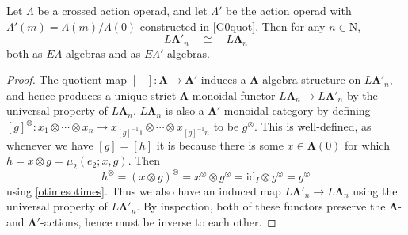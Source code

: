 \documentclass{amsbook} %
\newcommand{\id}{\textrm{id}}
\newcommand{\ML}{\mathbf{\Lambda}}
\numberwithin{section}{chapter}
\begin{document}
\begin{prop} \label{noscalarcross} Let $\Lambda$ be a crossed action operad, and let $\Lambda'$ be the action operad with $\Lambda'(m) = \Lambda(m)/\Lambda(0)$ constructed in \cref{G0quot}. Then for any $n \in \mathrm{N}$,
\[ L\ML'_n \quad \cong \quad L\ML_n \]
both as $E\Lambda$-algebras and as $E\Lambda'$-algebras. %
\end{prop}
\begin{proof}

The quotient map $[-]:\ML \to \ML'$ induces a $\ML$-algebra structure on $L\ML'_n$, and hence produces a unique strict $\ML$-monoidal functor $L\ML_n \to L\ML'_n$ by the universal property of $L\ML_n$. $L\ML_n$ is also a $\ML'$-monoidal category by defining $[g]^{\otimes} : x_1 \otimes \cdots \otimes x_n \to x_{[g]^{-1}1} \otimes \cdots \otimes x_{[g]^{-1}n}$ to be $g^{\otimes}$. This is well-defined, as whenever we have $[g] = [h]$ it is because there is some $x \in \ML(0)$ for which $h = x \otimes g = \mu_2(e_2; x, g)$. Then
\[
h^{\otimes} = (x \otimes g)^{\otimes} = x^{\otimes} \otimes g^{\otimes} = \id_I \otimes g^{\otimes} = g^{\otimes}
\]
using \cref{otimesotimes}. Thus we also have an induced map $L\ML'_n \to L\ML_n$ using the universal property of $L\ML'_n$. By inspection, both of these functors preserve the $\ML$- and $\ML'$-actions, hence must be inverse to each other.



\end{proof}
\end{document}
